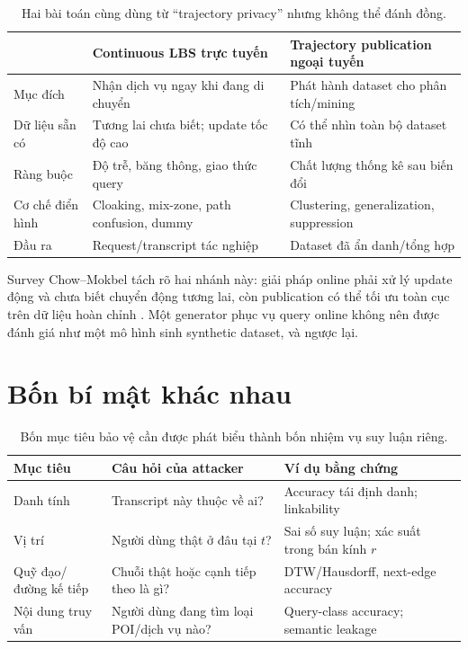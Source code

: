 \documentclass[11pt,a4paper,oneside]{report}
\begin{document}
\begin{table}[htbp]
\centering
\small
\caption{Hai bài toán cùng dùng từ ``trajectory privacy'' nhưng không thể đánh đồng.}
\label{tab:online-offline}
\begin{tabularx}{\textwidth}{P{3.4cm}Y Y}
\toprule
 & \textbf{Continuous LBS trực tuyến} & \textbf{Trajectory publication ngoại tuyến}\\
\midrule
Mục đích & Nhận dịch vụ ngay khi đang di chuyển & Phát hành dataset cho phân tích/mining\\
Dữ liệu sẵn có & Tương lai chưa biết; update tốc độ cao & Có thể nhìn toàn bộ dataset tĩnh\\
Ràng buộc & Độ trễ, băng thông, giao thức query & Chất lượng thống kê sau biến đổi\\
Cơ chế điển hình & Cloaking, mix-zone, path confusion, dummy & Clustering, generalization, suppression\\
Đầu ra & Request/transcript tác nghiệp & Dataset đã ẩn danh/tổng hợp\\
\bottomrule
\end{tabularx}
\end{table}

Survey Chow--Mokbel tách rõ hai nhánh này: giải pháp online phải xử lý update động
và chưa biết chuyển động tương lai, còn publication có thể tối ưu toàn cục trên dữ
liệu hoàn chỉnh \cite{chow2011trajectory}. Một generator phục vụ query online
không nên được đánh giá như một mô hình sinh synthetic dataset, và ngược lại.

\section{Bốn bí mật khác nhau}

\begin{table}[htbp]
\centering
\small
\caption{Bốn mục tiêu bảo vệ cần được phát biểu thành bốn nhiệm vụ suy luận riêng.}
\label{tab:privacy-targets}
\begin{tabularx}{\textwidth}{P{3.0cm}Y Y}
\toprule
\textbf{Mục tiêu} & \textbf{Câu hỏi của attacker} & \textbf{Ví dụ bằng chứng}\\
\midrule
Danh tính & Transcript này thuộc về ai? & Accuracy tái định danh; linkability\\
Vị trí & Người dùng thật ở đâu tại $t$? & Sai số suy luận; xác suất trong bán kính $r$\\
Quỹ đạo/đường kế tiếp & Chuỗi thật hoặc cạnh tiếp theo là gì? & DTW/Hausdorff, next-edge accuracy\\
Nội dung truy vấn & Người dùng đang tìm loại POI/dịch vụ nào? & Query-class accuracy; semantic leakage\\
\bottomrule
\end{tabularx}
\end{table}
\end{document}
